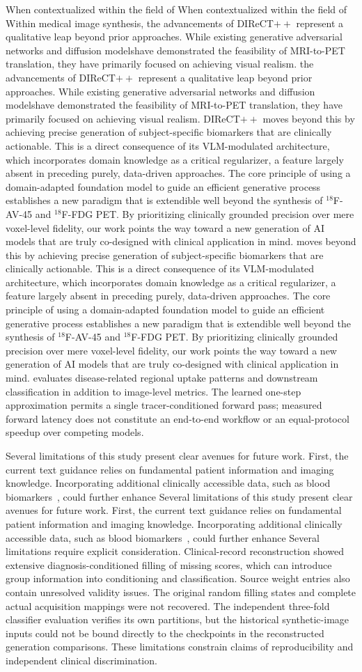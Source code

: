 \documentclass{article}
\providecommand{\DIFaddtex}[1]{{\protect\color{blue} \sf #1}} %
\providecommand{\DIFdeltex}[1]{{\protect\color{red} \ifmmode #1\else\scriptsize #1\fi}} %
\providecommand{\DIFaddbegin}{} %
\providecommand{\DIFaddend}{} %
\providecommand{\DIFdelbegin}{} %
\providecommand{\DIFdelend}{} %
\providecommand{\DIFadd}[1]{\texorpdfstring{\DIFaddtex{#1}}{#1}} %
\providecommand{\DIFdel}[1]{\texorpdfstring{\DIFdeltex{#1}}{}} %
\newcommand{\DIFscaledelfig}{0.5}
\newlength{\DIFdelgraphicswidth} %
\newlength{\DIFdelgraphicsheight} %
\newcommand{\DIFaddincludegraphics}[2][]{{\color{blue}\fbox{\DIFOincludegraphics[#1]{#2}}}} %
\newcommand{\DIFdelincludegraphics}[2][]{%
\sbox{\DIFdelgraphicsbox}{\DIFOincludegraphics[#1]{#2}}%
\settoboxwidth{\DIFdelgraphicswidth}{\DIFdelgraphicsbox} %
\settoboxtotalheight{\DIFdelgraphicsheight}{\DIFdelgraphicsbox} %
\scalebox{\DIFscaledelfig}{%
\parbox[b]{\DIFdelgraphicswidth}{\usebox{\DIFdelgraphicsbox}\\[-\baselineskip] \rule{\DIFdelgraphicswidth}{0em}}\llap{\resizebox{\DIFdelgraphicswidth}{\DIFdelgraphicsheight}{%
\setlength{\unitlength}{\DIFdelgraphicswidth}%
\begin{picture}(1,1)%
\thicklines\linethickness{2pt} %
{\color[rgb]{1,0,0}\put(0,0){\framebox(1,1){}}}%
{\color[rgb]{1,0,0}\put(0,0){\line( 1,1){1}}}%
{\color[rgb]{1,0,0}\put(0,1){\line(1,-1){1}}}%
\end{picture}%
}\hspace*{3pt}}} %
} %
\DeclareRobustCommand{\DIFaddbegin}{\DIFOaddbegin \let\includegraphics\DIFaddincludegraphics} %
\DeclareRobustCommand{\DIFaddend}{\DIFOaddend \let\includegraphics\DIFOincludegraphics} %
\DeclareRobustCommand{\DIFdelbegin}{\DIFOdelbegin \let\includegraphics\DIFdelincludegraphics} %
\DeclareRobustCommand{\DIFdelend}{\DIFOaddend \let\includegraphics\DIFOincludegraphics} %
\begin{document}
\DIFdelbegin \DIFdel{When contextualized within the field of }\DIFdelend \DIFaddbegin \DIFadd{Within }\DIFaddend medical image synthesis, \DIFdelbegin \DIFdel{the advancements of DIReCT$++$ represent a qualitative leap beyond prior approaches. While existing generative adversarial networks and diffusion modelshave demonstrated the feasibility of MRI-to-PET translation, they have primarily focused on achieving visual realism.
}\DIFdelend DIReCT$++$ \DIFdelbegin \DIFdel{moves beyond this by achieving precise generation of subject-specific biomarkers that are clinically actionable. This is a direct consequence of its VLM-modulated architecture, which incorporates domain knowledge as a critical regularizer, a feature largely absent in preceding purely, data-driven approaches. The core principle of using a domain-adapted foundation model to guide an efficient generative process establishes a new paradigm that is extendible well beyond the synthesis of $^{18}$F-AV-45 and $^{18}$F-FDG PET. By prioritizing clinically grounded precision over mere voxel-level fidelity, our work points the way toward a new generation of AI models that are truly co-designed with clinical application in mind. }\DIFdelend \DIFaddbegin \DIFadd{evaluates disease-related regional uptake patterns and downstream classification in addition to image-level metrics. The learned one-step approximation permits a single tracer-conditioned forward pass; measured forward latency does not constitute an end-to-end workflow or an equal-protocol speedup over competing models.
}\DIFaddend 

\DIFdelbegin \DIFdel{Several limitations of this study present clear avenues for future work.
First, the current text guidance relies on fundamental patient information and imaging knowledge. Incorporating additional clinically accessible data, such as blood biomarkers~\cite{hansson2023blood}, could further enhance }\DIFdelend \DIFaddbegin \DIFadd{Several limitations require explicit consideration. Clinical-record reconstruction showed extensive diagnosis-conditioned filling of missing scores, which can introduce group information into conditioning and classification. Source weight entries also contain unresolved validity issues. The original random filling states and complete actual acquisition mappings were not recovered. The independent three-fold classifier evaluation verifies its own partitions, but the historical synthetic-image inputs could not be bound directly to the checkpoints in the reconstructed generation comparisons. These limitations constrain claims of reproducibility and independent clinical discrimination.
}
\end{document}
